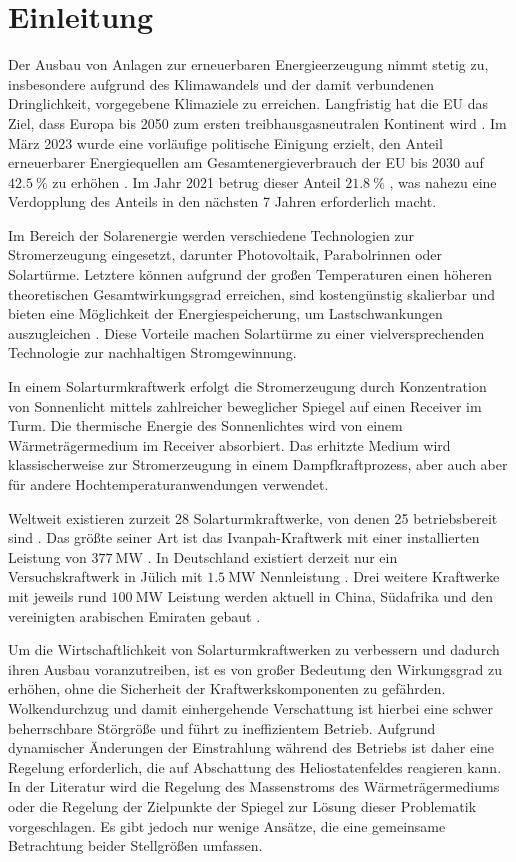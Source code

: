 \chapter{Einleitung} \label{ch_Einleitung}
Der Ausbau von Anlagen zur erneuerbaren Energieerzeugung nimmt stetig zu, insbesondere aufgrund des Klimawandels und der damit verbundenen Dringlichkeit, vorgegebene Klimaziele zu erreichen.
Langfristig hat die EU das Ziel, dass Europa bis 2050 zum ersten treibhausgasneutralen Kontinent wird \cite{Umweltbundesamt}.
Im März 2023 wurde eine vorläufige politische Einigung erzielt, den Anteil erneuerbarer Energiequellen am Gesamtenergieverbrauch der EU bis 2030 auf $\SI{42.5}{\percent}$ zu erhöhen \cite{RatEU}.
Im Jahr 2021 betrug dieser Anteil $\SI{21.8}{\percent}$ \cite{Destatis}, was nahezu eine Verdopplung des Anteils in den nächsten 7 Jahren erforderlich macht.

Im Bereich der Solarenergie werden verschiedene Technologien zur Stromerzeugung eingesetzt, darunter Photovoltaik, Parabolrinnen oder Solartürme.
Letztere können aufgrund der großen Temperaturen einen höheren theoretischen Gesamtwirkungsgrad erreichen, sind kostengünstig skalierbar und bieten eine Möglichkeit der Energiespeicherung, um Lastschwankungen auszugleichen \cite{Breeze}.
Diese Vorteile machen Solartürme zu einer vielversprechenden Technologie zur nachhaltigen Stromgewinnung.

In einem Solarturmkraftwerk erfolgt die Stromerzeugung durch Konzentration von Sonnenlicht mittels zahlreicher beweglicher Spiegel auf einen Receiver im Turm.
Die thermische Energie des Sonnenlichtes wird von einem Wärmeträgermedium im Receiver absorbiert.
Das erhitzte Medium wird klassischerweise zur Stromerzeugung in einem Dampfkraftprozess, aber auch aber für andere Hochtemperaturanwendungen verwendet.

Weltweit existieren zurzeit 28 Solarturmkraftwerke, von denen 25 betriebsbereit sind \cite{NREL1}.
Das größte seiner Art ist das Ivanpah-Kraftwerk mit einer installierten Leistung von $\SI{377}{\mega\watt}$ \cite{NREL2}.
In Deutschland existiert derzeit nur ein Versuchskraftwerk in Jülich mit $\SI{1.5}{\mega\watt}$ Nennleistung \cite{NREL3}.
Drei weitere Kraftwerke mit jeweils rund $\SI{100}{\mega\watt}$ Leistung werden aktuell in China, Südafrika und den vereinigten arabischen Emiraten gebaut \cite{NREL4}.

Um die Wirtschaftlichkeit von Solarturmkraftwerken zu verbessern und dadurch ihren Ausbau voranzutreiben, ist es von großer Bedeutung den Wirkungsgrad zu erhöhen, ohne die Sicherheit der Kraftwerkskomponenten zu gefährden.
Wolkendurchzug und damit einhergehende Verschattung ist hierbei eine schwer beherrschbare Störgröße und führt zu ineffizientem Betrieb.
Aufgrund dynamischer Änderungen der Einstrahlung während des Betriebs ist daher eine Regelung erforderlich, die auf Abschattung des Heliostatenfeldes reagieren kann.
In der Literatur wird die Regelung des Massenstroms des Wärmeträgermediums oder die Regelung der Zielpunkte der Spiegel zur Lösung dieser Problematik vorgeschlagen.
Es gibt jedoch nur wenige Ansätze, die eine gemeinsame Betrachtung beider Stellgrößen umfassen.


